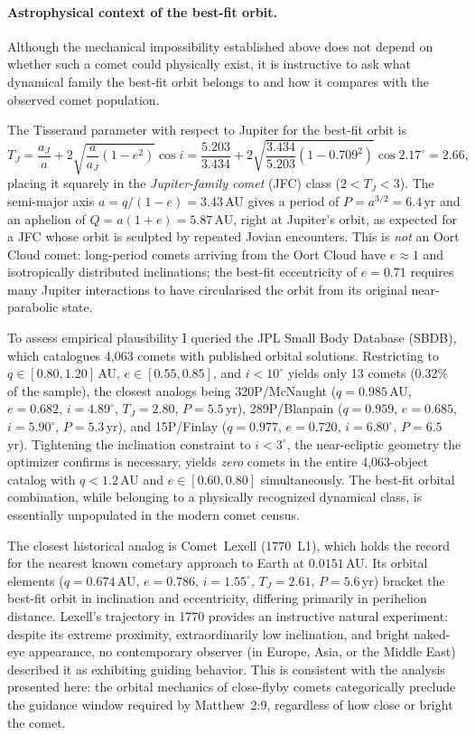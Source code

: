 \documentclass[11pt,a4paper]{article}
\begin{document}
\paragraph{Astrophysical context of the best-fit orbit.}
Although the mechanical impossibility established above does not depend on whether
such a comet could physically exist, it is instructive to ask what dynamical family
the best-fit orbit belongs to and how it compares with the observed comet population.

The Tisserand parameter with respect to Jupiter for the best-fit orbit is
\begin{equation}
  T_J = \frac{a_J}{a} + 2\sqrt{\frac{a}{a_J}(1-e^2)}\cos i
      = \frac{5.203}{3.434} + 2\sqrt{\frac{3.434}{5.203}(1-0.709^2)}\cos 2.17^\circ
      = 2.66,
  \label{eq:TJ}
\end{equation}
placing it squarely in the \emph{Jupiter-family comet} (JFC) class ($2 < T_J < 3$).
The semi-major axis $a = q/(1-e) = 3.43$\,AU gives a period of $P = a^{3/2} = 6.4$\,yr
and an aphelion of $Q = a(1+e) = 5.87$\,AU, right at Jupiter's orbit, as expected
for a JFC whose orbit is sculpted by repeated Jovian encounters.
This is \emph{not} an Oort Cloud comet: long-period comets arriving from the Oort
Cloud have $e \approx 1$ and isotropically distributed inclinations; the best-fit
eccentricity of $e = 0.71$ requires many Jupiter interactions to have circularised
the orbit from its original near-parabolic state.

To assess empirical plausibility I queried the JPL Small Body Database (SBDB),
which catalogues 4{,}063 comets with published orbital solutions. Restricting to
$q \in [0.80, 1.20]$\,AU, $e \in [0.55, 0.85]$, and $i < 10^\circ$ yields only 13
comets (0.32\% of the sample), the closest analogs being 320P/McNaught
($q = 0.985$\,AU, $e = 0.682$, $i = 4.89^\circ$, $T_J = 2.80$, $P = 5.5$\,yr),
289P/Blanpain ($q = 0.959$, $e = 0.685$, $i = 5.90^\circ$, $P = 5.3$\,yr), and
15P/Finlay ($q = 0.977$, $e = 0.720$, $i = 6.80^\circ$, $P = 6.5$\,yr).
Tightening the inclination constraint to $i < 3^\circ$, the near-ecliptic geometry
the optimizer confirms is necessary, yields \emph{zero} comets in the entire 4{,}063-object
catalog with $q < 1.2$\,AU and $e \in [0.60, 0.80]$ simultaneously.
The best-fit orbital combination, while belonging to a physically recognized
dynamical class, is essentially unpopulated in the modern comet census.

The closest historical analog is Comet~Lexell (1770~L1), which holds the record for
the nearest known cometary approach to Earth at $0.0151$\,AU. Its orbital elements
($q = 0.674$\,AU, $e = 0.786$, $i = 1.55^\circ$, $T_J = 2.61$, $P = 5.6$\,yr)
bracket the best-fit orbit in inclination and eccentricity, differing primarily in
perihelion distance. Lexell's trajectory in 1770 provides an instructive natural
experiment: despite its extreme proximity, extraordinarily low inclination, and bright
naked-eye appearance, no contemporary observer (in Europe, Asia, or the Middle
East) described it as exhibiting guiding behavior. This is consistent with the
analysis presented here: the orbital mechanics of close-flyby comets categorically preclude the
guidance window required by Matthew~2:9, regardless of how close or bright the comet.
\end{document}

